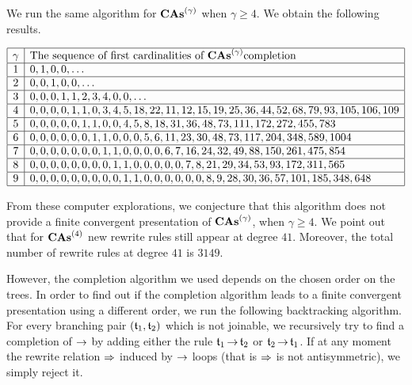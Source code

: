 We run the same algorithm for $\mathbf{CAs}^{\left(\gamma\right)}$ when $\gamma \geq 4$.
We obtain the following results.
\medbreak

\begin{center}
  \begin{math} \label{arr:completions_CAs}
    \begin{array}{|c|l|}
      \hline
      \gamma & \mbox{The sequence of first cardinalities of }
       \mathbf{CAs}^{\left(\gamma\right)} \mbox{completion}\\ \hline
      1 & 0, 1, 0, 0, \dots \\ \hline
      2 & 0, 0, 1, 0, 0, \dots \\ \hline
      3 & 0, 0, 0, 1, 1, 2, 3, 4, 0, 0, \dots \\ \hline
      4 & 0, 0, 0, 0, 1, 1, 0, 3, 4, 5, 18, 22, 11, 12, 15, 19, 25, 36,
       44, 52, 68, 79, 93, 105, 106, 109 \\ \hline
      5 & 0, 0, 0, 0, 0, 1, 1, 0, 0, 4, 5, 8, 18, 31, 36, 48, 73, 111,
       172, 272, 455, 783 \\ \hline
      6 & 0, 0, 0, 0, 0, 0, 1, 1, 0, 0, 0, 5, 6, 11, 23, 30, 48, 73,
      117, 204, 348, 589, 1004 \\ \hline
      7 & 0, 0, 0, 0, 0, 0, 0, 1, 1, 0, 0, 0, 0, 6, 7, 16, 24, 32, 49,
      88, 150, 261, 475, 854\\ \hline
      8 & 0, 0, 0, 0, 0, 0, 0, 0, 1, 1, 0, 0, 0, 0, 0, 7, 8, 21, 29,
      34, 53, 93, 172, 311, 565\\ \hline
      9 & 0, 0, 0, 0, 0, 0, 0, 0, 0, 1, 1, 0, 0, 0, 0, 0, 0, 8, 9, 28,
      30, 36, 57, 101, 185, 348, 648\\ \hline
    \end{array}
  \end{math}
\end{center}
\medbreak

From these computer explorations, we conjecture that this algorithm
does not provide a finite convergent presentation of $\mathbf{CAs}^{\left(\gamma\right)}$,
when $\gamma \geq 4$. We point out that for $\mathbf{CAs}^{\left(4\right)}$ new
rewrite rules still appear at degree $41$. Moreover, the total number of
rewrite rules at degree $41$ is $3149$.
\medbreak

However, the completion algorithm we used depends on the chosen order on
the trees. In order to find out if the completion algorithm leads to a
finite convergent presentation using a different order, we run the
following backtracking algorithm. For every branching pair
$(\mathfrak{t}_1, \mathfrak{t}_2)$ which is not joinable, we recursively try to find a
completion of $\operatorname{\to}$ by adding either the rule
$\mathfrak{t}_1 \operatorname{\to}  \mathfrak{t}_2$ or $\mathfrak{t}_2 \operatorname{\to}  \mathfrak{t}_1$.
If at any moment the rewrite relation $\operatorname{\Rightarrow}$ induced by $\operatorname{\to}$
loops (that is $\operatorname{\Rightarrow}$ is not antisymmetric), we simply reject it.
\medbreak

